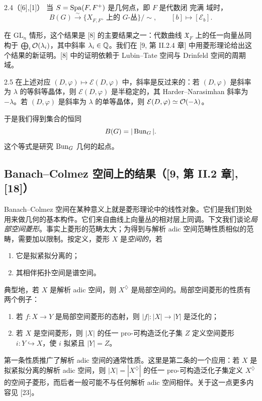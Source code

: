 \begin{thm}{2.4}（[6],[1]）
当 $S=\operatorname{Spa}(F,F^+)$ 是几何点，即 $F$ 是代数闭 完满 域时，
\[
B(G)\xrightarrow{\ \sim\ }\{X_{F,F^+}\ \text{上的 }G\text{-丛}\}/\sim,\qquad [b]\longmapsto[\mathcal E_b].
\]
\label{thm:a3-2-4}
\end{thm}

在 $\mathrm{GL}_n$ 情形，这个结果是 [8] 的主要结果之一：代数曲线 $\mathfrak X_F$ 上的任一向量丛同构于 $\bigoplus_i\mathcal{O}(\lambda_i)$，其中斜率 $\lambda_i\in\mathbb{Q}$。我们在 [9, 第 II.2.4 章] 中用菱形理论给出这个结果的新证明。[8] 中的证明依赖于 Lubin–Tate 空间与 Drinfeld 空间的周期域。

\begin{rem}{2.5}
在上述对应 $(D,\varphi)\mapsto\mathcal E(D,\varphi)$ 中，斜率是反过来的：若 $(D,\varphi)$ 是斜率为 $\lambda$ 的等斜等晶体，则 $\mathcal E(D,\varphi)$ 是半稳定的，其 Harder–Narasimhan 斜率为 $-\lambda$。若 $(D,\varphi)$ 是斜率为 $\lambda$ 的单等晶体，则 $\mathcal E(D,\varphi)\simeq\mathcal{O}(-\lambda)$。
\label{rem:a3-2-5}
\end{rem}

于是我们得到集合的恒同
\[
B(G)=|\operatorname{Bun}_G|.
\]
这个等式是研究 $\operatorname{Bun}_G$ 几何的起点。

\subsection{Banach–Colmez 空间上的结果（[9, 第 II.2 章], [18]）}

Banach–Colmez 空间在某种意义上就是菱形理论中的线性对象。它们是我们到处用来做几何的基本构件。它们来自曲线上向量丛的相对层上同调。下文我们谈论\emph{局部空间菱形}。事实上菱形的范畴太大；为得到与解析 adic 空间范畴性质相似的范畴，需要加以限制。按定义，菱形 $X$ 是\emph{空间的}，若
\begin{enumerate}[label=(\arabic*),leftmargin=2.2em,itemsep=0.1em]
\item 它是拟紧拟分离的；
\item 其相伴拓扑空间是谱空间。
\end{enumerate}
典型地，若 $X$ 是解析 adic 空间，则 $X^{\diamondsuit}$ 是局部空间的。局部空间菱形的性质有两个例子：
\begin{enumerate}[label=(\arabic*),leftmargin=2.2em,itemsep=0.1em]
\item 若 $f:X\to Y$ 是局部空间菱形的态射，则 $|f|:|X|\to|Y|$ 是泛化的；
\item 若 $X$ 是空间菱形，则 $|X|$ 的任一 pro-可构造泛化子集 $Z$ 定义空间菱形 $i:Y\hookrightarrow X$，使 $i$ 拟紧且 $|Y|=Z$。
\end{enumerate}
第一条性质推广了解析 adic 空间的通常性质。这里是第二条的一个应用：若 $X$ 是拟紧拟分离的解析 adic 空间，则 $|X|=|X^{\diamondsuit}|$ 的任一 pro-可构造泛化子集定义 $X^{\diamondsuit}$ 的空间子菱形，而后者一般可能不与任何解析 adic 空间相伴。关于这一点更多内容见 [23]。

